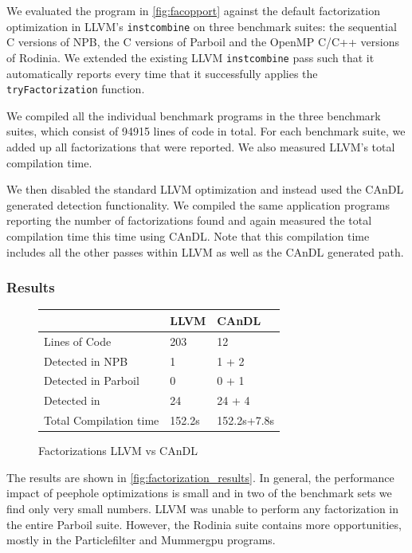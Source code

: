     We evaluated the program in \autoref{fig:facopport} against the default
    factorization optimization in LLVM's \texttt{instcombine} on three benchmark
    suites: the sequential C versions of NPB, the C versions of Parboil and the
    OpenMP C/C++ versions of Rodinia.
    We extended the existing LLVM \texttt{instcombine} pass such that it
    automatically reports every time that it successfully applies the
    \texttt{tryFactorization} function.  

    We compiled all the individual benchmark programs in the three benchmark
    suites, which consist of 94915 lines of code in total.
    For each benchmark suite, we added up all factorizations that were
    reported.
    We also measured LLVM's total compilation time.  

    We then disabled the standard LLVM optimization and instead used the CAnDL
    generated detection functionality.
    We compiled the same application programs reporting the number of
    factorizations found and again measured the total compilation time this time
    using CAnDL.
    Note that this compilation time includes all the other passes within LLVM as
    well as the CAnDL generated path.

\subsubsection{Results}
\begin{figure}[ht]
\centering
\begin{tabular}{|l||l|l|}
\hline
         & LLVM  &CAnDL \\
\hline
\hline
Lines of Code & 203 & 12 \\ \hline
Detected in NPB & 1 & 1 + 2 \\
Detected in Parboil & 0 & 0 + 1\\
Detected in  & 24 & 24 + 4\\ \hline
Total Compilation time & 152.2s & 152.2s+7.8s \\ \hline
\hline
\end{tabular}
\vspace{-0.1cm}
\caption{Factorizations LLVM vs CAnDL}
\label{fig:factorization_results}
\end{figure}

    The results are shown in \autoref{fig:factorization_results}.
    In general, the performance impact of peephole optimizations is small
    and in two of the benchmark sets we find only very small numbers.
    LLVM was unable to perform any factorization in the entire Parboil suite.
    However,  the Rodinia suite contains more opportunities, mostly in the
    Particlefilter and Mummergpu programs.

